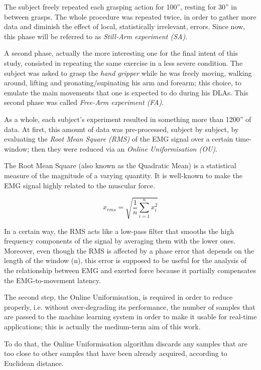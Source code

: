 The subject freely repeated each grasping action for 100'', resting for 30'' in between grasps. The whole procedure was repeated twice, in order to gather more data and diminish the effect of local, statistically irrelevant, errors. 
Since now, this phase will be referred to as \emph{Still-Arm experiment (SA)}.

A second phase, actually the more interesting one for the final intent of this study, consisted in repeating the same exercise in a less severe condition. The subject was asked to grasp the \textit{hand gripper} while he was freely moving, walking around, lifting and pronating/supinating his arm and forearm; this choice, to emulate the main movements that one is expected to do during his DLAs.
This second phase was called \emph{Free-Arm experiment (FA)}.


As a whole, each subject's experiment resulted in something more than 1200'' of data. At first, this amount of data was pre-processed, subject by subject, by evaluating the \emph{Root Mean Square (RMS)} of the EMG signal over a certain time-window; then they were reduced via an \emph{Online Uniformisation (OU)}.

The Root Mean Square (also known as the Quadratic Mean) is a statistical measure of the magnitude of a varying quantity. It is well-known to make the EMG signal highly related to the muscular force.

\begin{displaymath}
x_{rms} = \sqrt{\frac{1}{n}\sum_{i=1}^{n}x_{i}^{2}}
\end{displaymath}

In a certain way, the RMS acts like a low-pass filter that smooths the high frequency components of the signal by averaging them with the lower ones.
Moreover, even though the RMS is affected by a phase error that depends on the length of the window (n), this error is supposed to be useful for the analysis of the relationship between EMG and exerted force because it partially compensates the EMG-to-movement latency.

The second step, the Online Uniformisation, is required in order to reduce properly, i.e. without over-degrading its performance, the number of samples that are passed to the machine learning system in order to make it usable for real-time applications; this is actually the medium-term aim of this work.

To do that, the Online Uniformisation algorithm discards any samples that are too close to other samples that have been already acquired, according to Euclidean distance.

